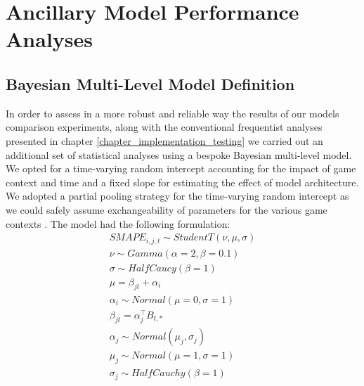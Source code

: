 \chapter{Ancillary Model Performance Analyses}

\section{Bayesian Multi-Level Model Definition}
\label{bayesian_multilevel_model}
In order to assess in a more robust and reliable way the results of our models comparison experiments, along with the conventional frequentist analyses presented in chapter \ref{chapter_implementation_testing} we carried out an additional set of statistical analyses using a bespoke Bayesian multi-level model. We opted for a time-varying random intercept accounting for the impact of game context and time and a fixed slope for estimating the effect of model architecture. We adopted a partial pooling strategy for the time-varying random intercept as we could safely assume exchangeability of parameters for the various game contexts \cite{gelman2020bayesian}. The model had the following formulation:
\begin{gather}
    \label{bayesian_mlm}
    SMAPE_{i, j, t} \sim StudentT(\nu, \mu, \sigma) \\ \nonumber
    \nu \sim Gamma(\alpha=2, \beta=0.1) \\ \nonumber
    \sigma \sim HalfCaucy(\beta=1)  \\ \nonumber
    \mu = \beta_{jt} + \alpha_{i}  \\ \nonumber
    \alpha_{i} \sim Normal(\mu=0, \sigma=1)  \\ \nonumber
    \beta_{jt} = \alpha_{j}^\top B_{t,*} \\ \nonumber
    \alpha_{j} \sim Normal(\mu_j, \sigma_j) \\ \nonumber
    \mu_j \sim Normal(\mu=1, \sigma=1) \\ \nonumber
    \sigma_j \sim HalfCauchy(\beta=1) \\ \nonumber
\end{gather}
